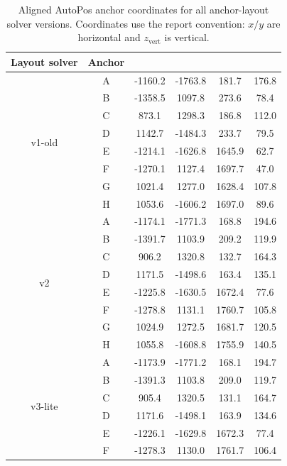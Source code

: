 \documentclass[11pt,a4paper]{article}
\newcommand{\si}[1]{\textnormal{##1}}
\newcommand{\milli}{m}
\newcommand{\metre}{m}
\begin{document}
\begin{table}[H]
\centering
\caption{Aligned AutoPos anchor coordinates for all anchor-layout solver versions. Coordinates use the report convention: $x/y$ are horizontal and $z_{\mathrm{vert}}$ is vertical.}
\label{tab:app_anchor_coords_all}
\scriptsize
\setlength{\tabcolsep}{5.0pt}
\renewcommand{\arraystretch}{0.92}
\begin{tabular}{c c c c c c}
\toprule
{Layout solver} & {Anchor} & {$x$ [\si{\milli\metre}]} & {$y$ [\si{\milli\metre}]} & {$z_{\mathrm{vert}}$ [\si{\milli\metre}]} & {3D err. [\si{\milli\metre}]} \\
\midrule
\multirow{8}{*}{v1-old}
  & A & -1160.2 & -1763.8 &  181.7 & 176.8 \\
  & B & -1358.5 &  1097.8 &  273.6 &  78.4 \\
  & C &   873.1 &  1298.3 &  186.8 & 112.0 \\
  & D &  1142.7 & -1484.3 &  233.7 &  79.5 \\
  & E & -1214.1 & -1626.8 & 1645.9 &  62.7 \\
  & F & -1270.1 &  1127.4 & 1697.7 &  47.0 \\
  & G &  1021.4 &  1277.0 & 1628.4 & 107.8 \\
  & H &  1053.6 & -1606.2 & 1697.0 &  89.6 \\
\midrule
\multirow{8}{*}{v2}
  & A & -1174.1 & -1771.3 &  168.8 & 194.6 \\
  & B & -1391.7 &  1103.9 &  209.2 & 119.9 \\
  & C &   906.2 &  1320.8 &  132.7 & 164.3 \\
  & D &  1171.5 & -1498.6 &  163.4 & 135.1 \\
  & E & -1225.8 & -1630.5 & 1672.4 &  77.6 \\
  & F & -1278.8 &  1131.1 & 1760.7 & 105.8 \\
  & G &  1024.9 &  1272.5 & 1681.7 & 120.5 \\
  & H &  1055.8 & -1608.8 & 1755.9 & 140.5 \\
\midrule
\multirow{8}{*}{v3-lite}
  & A & -1173.9 & -1771.2 &  168.1 & 194.7 \\
  & B & -1391.3 &  1103.8 &  209.0 & 119.7 \\
  & C &   905.4 &  1320.5 &  131.1 & 164.7 \\
  & D &  1171.6 & -1498.1 &  163.9 & 134.6 \\
  & E & -1226.1 & -1629.8 & 1672.3 &  77.4 \\
  & F & -1278.3 &  1130.0 & 1761.7 & 106.4 \\

\end{tabular}
\end{table}
\end{document}
